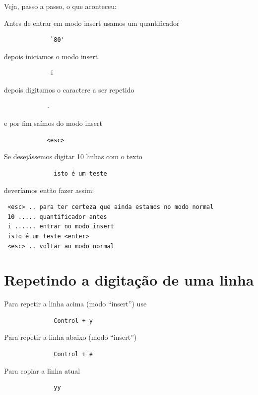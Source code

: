 \documentclass[10pt,a4paper,openany]{book}
\begin{document}
Veja, passo a passo, o que aconteceu:

 Antes de entrar em modo insert usamos um quantificador

\begin{verbatim}
			 `80'
\end{verbatim}

 depois iniciamos o modo insert

\begin{verbatim}
			 i
\end{verbatim}

depois digitamos o caractere a ser repetido

\begin{verbatim}
			-
\end{verbatim}

e por fim saímos do modo insert

\begin{verbatim}
			<esc>
\end{verbatim}

Se desejássemos digitar 10 linhas com o texto

\begin{verbatim}
			  isto é um teste
\end{verbatim}

deveríamos então fazer assim:
	
\begin{verbatim}
 <esc> .. para ter certeza que ainda estamos no modo normal
 10 ..... quantificador antes
 i ...... entrar no modo insert
 isto é um teste <enter>
 <esc> .. voltar ao modo normal
\end{verbatim}

\section{Repetindo a digitação de uma linha }
Para repetir a linha acima (modo ``insert'') use

\begin{verbatim}
			  Control + y
\end{verbatim}

Para repetir a linha abaixo (modo ``insert'')

\begin{verbatim}
			  Control + e
\end{verbatim}

Para copiar a linha atual

\begin{verbatim}
			  yy
\end{verbatim}
\end{document}
